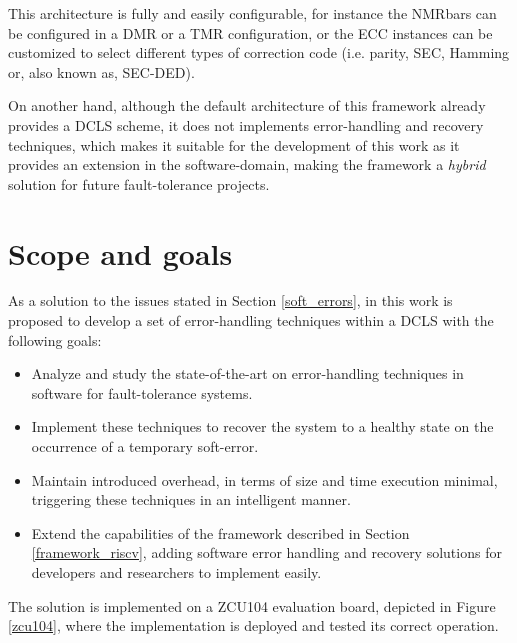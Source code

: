 \documentclass[10pt, a4paper]{report}
\begin{document}
This architecture is fully and easily configurable, for instance the
\acrshort{NMRbar}s can be configured in a \acrfull{DMR} or a \acrshort{TMR} 
configuration, or the \acrshort{ECC} instances can be customized to select
different types of correction code (i.e. parity, \acrfull{SEC}, Hamming or, also
known as, \acrfull{SEC-DED}).

On another hand, although the default architecture of this framework already
provides a \acrshort{DCLS} scheme, it does not implements error-handling
and recovery techniques, which makes it suitable for the development of this
work as it provides an extension in the software-domain, making the framework
a \emph{hybrid} solution for future fault-tolerance projects.

\section{Scope and goals}

As a solution to the issues stated in Section \ref{soft_errors}, in this work is
proposed to develop a set of error-handling techniques within a \acrshort{DCLS}
with the following goals:

\begin{itemize}
    \item Analyze and study the state-of-the-art on error-handling techniques
        in software for fault-tolerance systems.
    \item Implement these techniques to recover the system to a healthy state on 
        the occurrence of a temporary soft-error.
    \item Maintain introduced overhead, in terms of size and time execution
        minimal, triggering these techniques in an intelligent manner.
    \item Extend the capabilities of the framework described in Section
        \ref{framework_riscv}, adding software error handling and recovery
        solutions for developers and researchers to implement easily.
\end{itemize}

The solution is implemented on a ZCU104 evaluation board, depicted in Figure
\ref{zcu104}, where the implementation is deployed and tested its correct
operation.
\end{document}
